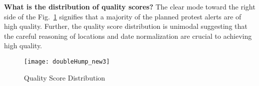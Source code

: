 \noindent
{\bf What is the distribution of quality scores?}
The clear mode toward the right side of the Fig.~\ref{fig:doubleHump} signifies that a majority of the planned 
protest alerts are of high quality. Further, the quality score distribution is unimodal suggesting that the careful reasoning of locations and date normalization are crucial to achieving high quality.
\begin{figure}[h!]
    \centering
  \texttt{[image: doubleHump\_new3]}
    \vspace{-.5em}
  \caption{Quality Score Distribution}
  \label{fig:doubleHump}
    \vspace{-1.5em}
\end{figure}
%

